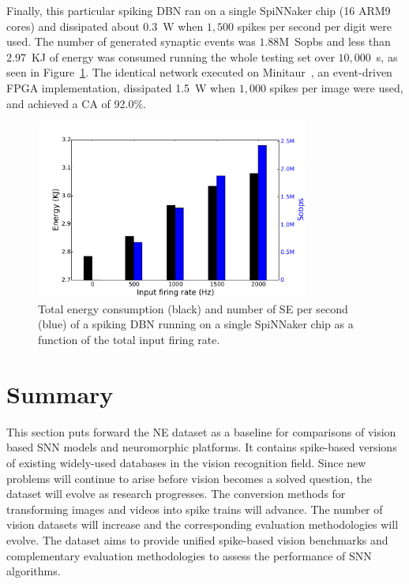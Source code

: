 Finally, this particular spiking DBN ran on a single SpiNNaker chip (16 ARM9 cores) and dissipated about 0.3~W when $1,500$ spikes per second per digit were used.
The number of generated synaptic events was $1.88$M~Sopbs and less than 2.97~KJ of energy was consumed running the whole testing set over $10,000$~s, as seen in Figure~\ref{Fig:spinnchipPower}. The identical network executed on Minitaur~\cite{neil2014minitaur}, an event-driven FPGA implementation, dissipated 1.5~W when $1,000$ spikes per image were used, and achieved a CA of 92.0\%.

\begin{figure}[hbt!]
	\centering
	\includegraphics[width=0.8\textwidth]{pics_bench/fig12_m}
	\caption{
		Total energy consumption (black) and number of SE per second (blue) of a spiking DBN running on a single SpiNNaker chip as a function of the total input firing rate.}
	\label{Fig:spinnchipPower}
\end{figure} 

\section{Summary}
This section puts forward the NE dataset as a baseline for comparisons of vision based SNN models and neuromorphic platforms.
It contains spike-based versions of existing widely-used databases in the vision recognition field.
Since new problems will continue to arise before vision becomes a solved question, the dataset will evolve as research progresses. 
The conversion methods for transforming images and videos into spike trains will advance. The number of vision datasets will increase and the corresponding evaluation methodologies will evolve.
The dataset aims to provide unified spike-based vision benchmarks and complementary evaluation methodologies to assess the performance of SNN algorithms.

